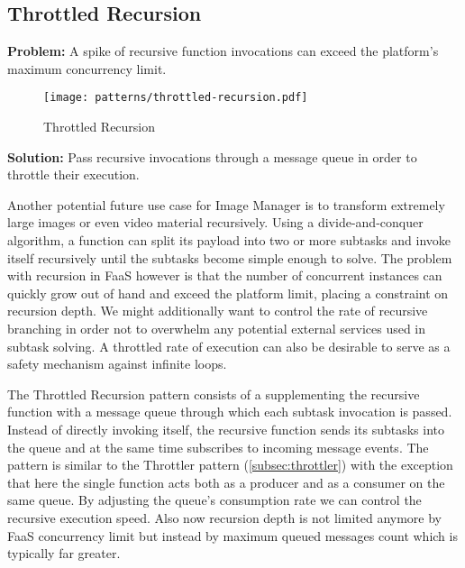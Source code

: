\subsection{Throttled Recursion} \label{subsec:throttledRecursion}

\textbf{Problem:} A spike of recursive function invocations can exceed the platform's maximum concurrency limit.

\begin{figure}[h]
  \centering
  \texttt{[image: patterns/throttled-recursion.pdf]}
  \caption{Throttled Recursion}
  \label{fig:throttledRecursion}
\end{figure}

\textbf{Solution:} Pass recursive invocations through a message queue in order to throttle their execution.

Another potential future use case for Image Manager is to transform extremely large images or even video material recursively. Using a divide-and-conquer algorithm, a function can split its payload into two or more subtasks and invoke itself recursively until the subtasks become simple enough to solve. The problem with recursion in FaaS however is that the number of concurrent instances can quickly grow out of hand and exceed the platform limit, placing a constraint on recursion depth. We might additionally want to control the rate of recursive branching in order not to overwhelm any potential external services used in subtask solving. A throttled rate of execution can also be desirable to serve as a safety mechanism against infinite loops.

The Throttled Recursion pattern consists of a supplementing the recursive function with a message queue through which each subtask invocation is passed. Instead of directly invoking itself, the recursive function sends its subtasks into the queue and at the same time subscribes to incoming message events. The pattern is similar to the Throttler pattern (\ref{subsec:throttler}) with the exception that here the single function acts both as a producer and as a consumer on the same queue. By adjusting the queue's consumption rate we can control the recursive execution speed. Also now recursion depth is not limited anymore by FaaS concurrency limit but instead by maximum queued messages count which is typically far greater.
